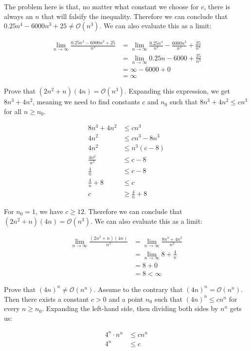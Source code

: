 The problem here is that, no matter what constant we choose for $c$, there is always an $n$ that will falsify the inequality. Therefore we can conclude that $0.25n^4 - 6000n^3 + 25 \neq \mathcal{O}(n^3)$. We can also evaluate this as a limit:

\begin{align*}
  \lim_{n \to \infty} \frac{0.25n^4 - 6000n^3 + 25}{n^3} &= \lim_{n \to \infty} \frac{0.25n^4}{n^3} - \frac{6000n^3}{n^3} + \frac{25}{n^3}\\
  &= \lim_{n \to \infty} 0.25n - 6000 + \frac{25}{n^3}\\
  &= \infty - 6000 + 0\\
  &= \infty
\end{align*}

\example Prove that $(2n^2 + n)(4n) = \mathcal{O}(n^3)$. Expanding this expression, we get $8n^3 + 4n^2$, meaning we need to find constants $c$ and $n_0$ such that $8n^3 + 4n^2 \leq cn^3$ for all $n\geq n_0$.

\begin{align*}
  8n^3 + 4n^2 &\leq cn^3\\
  4n^2 &\leq cn^3 - 8n^3\\
  4n^2 &\leq n^3(c - 8)\\
  \frac{4n^2}{n^3} &\leq c - 8\\
  \frac{4}{n} &\leq c - 8\\
  \frac{4}{n} + 8 &\leq c\\
  c &\geq \frac{4}{n} + 8
\end{align*}

For $n_0 = 1$, we have $c \geq 12$. Therefore we can conclude that $(2n^2 + n)(4n) = \mathcal{O}(n^3)$. We can also evaluate this as a limit:

\begin{align*}
  \lim_{n \to \infty} \frac{(2n^2 + n)(4n)}{n^3} &= \lim_{n \to \infty} \frac{8n^3 + 4n^2}{n^3}\\
  &= \lim_{n \to \infty} 8 + \frac{4}{n}\\
  &= 8 + 0\\
  &= 8 < \infty
\end{align*}

\example Prove that $(4n)^n \neq \mathcal{O}(n^n)$. Assume to the contrary that $(4n)^n = \mathcal{O}(n^n)$. Then there exists a constant $c > 0$ and a point $n_0$ such that $(4n)^n \leq cn^n$ for every $n \geq n_0$. Expanding the left-hand side, then dividing both sides by $n^n$ gets us:

\begin{align*}
  4^n \cdot n^n &\leq cn^n\\
  4^n &\leq c
\end{align*}

